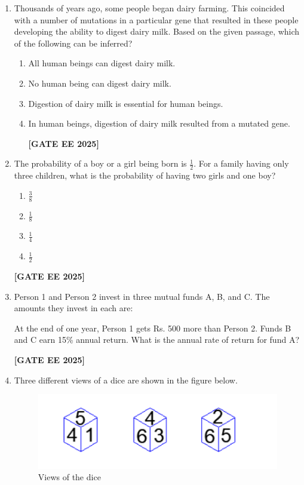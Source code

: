 \documentclass[journal]{IEEEtran}
\newcommand{\qfooter}{%
  \begin{flushright}\footnotesize\textbf{[GATE EE 2025]}\end{flushright}\vspace{1em}%
}
\begin{document}
\begin{enumerate}[leftmargin=*,label=\arabic*.]
\item Thousands of years ago, some people began dairy farming. This coincided with a  
number of mutations in a particular gene that resulted in these people developing the ability to digest dairy milk.  
Based on the given passage, which of the following can be inferred?
\begin{enumerate}
\item All human beings can digest dairy milk.
\item No human being can digest dairy milk.
\item Digestion of dairy milk is essential for human beings.
\item In human beings, digestion of dairy milk resulted from a mutated gene.
\qfooter
\end{enumerate}
\item The probability of a boy or a girl being born is $\frac{1}{2}$. For a family having only three children, what is the probability of having two girls and one boy?
\begin{multicols}{4}
\begin{enumerate}[label=(\Alph*)]
\item $\frac{3}{8}$
\item $\frac{1}{8}$
\item $\frac{1}{4}$
\item $\frac{1}{2}$
\end{enumerate} 
\qfooter
\end{multicols}

\item Person 1 and Person 2 invest in three mutual funds A, B, and C. The amounts they invest in each are:

At the end of one year, Person 1 gets Rs. 500 more than Person 2. Funds B and C earn 15\% annual return.  
What is the annual rate of return for fund A?
\begin{enumerate}
\qfooter
\end{enumerate}
 
\item Three different views of a dice are shown in the figure below.

\begin{figure}[h]
\centering
\includegraphics[width=0.42\columnwidth]{figs/q9.png} %
\caption*{Views of the dice}
\end{figure}


\end{enumerate}
\end{document}
